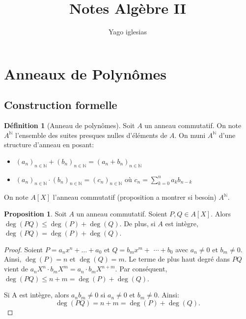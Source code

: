 \documentclass{article}
\theoremstyle{definition}
\newtheorem{definition}{Définition}
\theoremstyle{definition}
\newtheorem{prop}{Proposition}
\theoremstyle{definition}
\theoremstyle{plain}
\theoremstyle{theorem}
\begin{document}
\title{Notes Algèbre II}
\author{Yago iglesias}
\maketitle
\tableofcontents

\section{Anneaux de Polynômes}

\subsection{Construction formelle}

\begin{definition}[Anneau de polynômes]

	Soit $A$ un anneau commutatif. On note $A^{\mathbb{N}}$ l'ensemble des suites presques nulles d'éléments de $A$.
	On muni $A^{\mathbb{N}}$ d'une structure d'anneau en posant:
	\begin{itemize}
		\item $(a_n)_{n \in \mathbb{N}} + (b_n)_{n \in \mathbb{N}} = (a_n + b_n)_{n \in \mathbb{N}}$
		\item $(a_n)_{n \in \mathbb{N}} \cdot (b_n)_{n \in \mathbb{N}} = (c_n)_{n \in \mathbb{N}}$ où $c_n = \sum_{k=0}^{n} a_k b_{n-k}$
	\end{itemize}

	On note $A[X]$ l'anneau commutatif (proposition a montrer si besoin)  $A^{\mathbb{N}}$.

\end{definition}

\begin{prop}
	Soit $A$ un anneau commutatif.
	Soient $P, Q \in A[X]$. Alors $\deg(PQ) \leq \deg(P) + \deg(Q)$.
	De plus, si $A$ est intègre, $\deg(PQ) = \deg(P) + \deg(Q)$.
\end{prop}

\begin{proof}
	Soient $P=a_n x^n+\ldots+a_0$ et $Q=b_m x^m+$ $\cdots+b_0$ avec $a_n \neq 0$ et $b_m \neq 0$.
	Ainsi, $\deg(P)=n$ et $\deg(Q)=m$. Le terme de plus haut degré dans $P Q$ vient de $a_n X^n \cdot b_m X^m=a_n \cdot b_m X^{n+m}$.
	Par conséquent, $\deg(P Q) \leq n+m=\deg(P)+\deg(Q)$.

	Si A est intègre, alors $a_n b_m \neq 0$ si $a_n \neq 0$ et $b_m \neq 0$. Ainsi:
	$$
		\deg(P Q)=n+m=\deg(P)+\deg(Q).
	$$
\end{proof}
\end{document}
